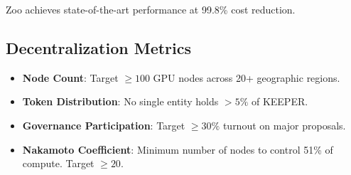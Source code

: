 Zoo achieves state-of-the-art performance at 99.8\% cost reduction.

\subsection{Decentralization Metrics}

\begin{itemize}
\item \textbf{Node Count}: Target $\geq 100$ GPU nodes across 20+ geographic regions.
\item \textbf{Token Distribution}: No single entity holds $> 5\%$ of KEEPER.
\item \textbf{Governance Participation}: Target $\geq 30\%$ turnout on major proposals.
\item \textbf{Nakamoto Coefficient}: Minimum number of nodes to control 51\% of compute. Target $\geq 20$.
\end{itemize}

